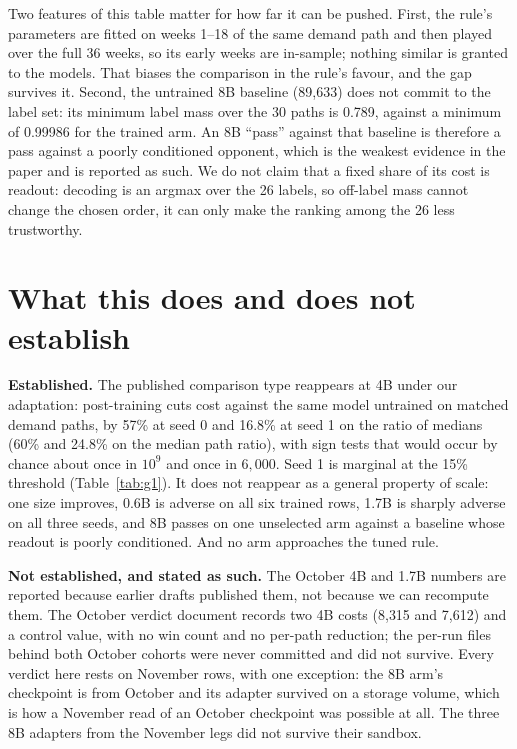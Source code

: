 \documentclass[11pt]{article}
\begin{document}
Two features of this table matter for how far it can be pushed. First, the rule's parameters are
fitted on weeks 1--18 of the same demand path and then played over the full 36 weeks, so its early
weeks are in-sample; nothing similar is granted to the models. That biases the comparison in the
rule's favour, and the gap survives it. Second, the untrained 8B baseline (89{,}633) does not commit to the label set: its minimum label mass
over the 30 paths is 0.789, against a minimum of 0.99986 for the trained arm. An 8B ``pass''
against that baseline is therefore a pass against a poorly conditioned opponent, which is the weakest
evidence in the paper and is reported as such. We do not claim that a fixed share of its cost is
readout: decoding is an argmax over the 26 labels, so off-label mass cannot change the chosen order,
it can only make the ranking among the 26 less trustworthy.

\section{What this does and does not establish}\label{sec:solid}

\textbf{Established.} The published comparison type reappears at 4B under our adaptation: post-training
cuts cost against the same model untrained on matched demand paths, by 57\% at seed 0 and 16.8\% at
seed 1 on the ratio of medians (60\% and 24.8\% on the median path ratio), with sign tests that would
occur by chance about once in $10^{9}$ and once in $6{,}000$. Seed 1 is marginal at the 15\% threshold
(Table~\ref{tab:g1}). It does not
reappear as a general property of scale: one size improves, 0.6B is adverse on all six trained rows,
1.7B is sharply adverse on all three seeds, and 8B passes on one unselected arm against a baseline
whose readout is poorly conditioned. And no arm approaches the tuned rule.

\textbf{Not established, and stated as such.} The October 4B and 1.7B numbers are reported because
earlier drafts published them, not because we can recompute them. The October verdict document records
two 4B costs (8{,}315 and 7{,}612) and a control value, with no win count and no per-path reduction; the
per-run files behind both October cohorts were never committed and did not survive. Every verdict here
rests on November rows, with one exception: the 8B arm's checkpoint is from October and its adapter
survived on a storage volume, which is how a November read of an October checkpoint was possible at
all. The three 8B adapters from the November legs did not survive their sandbox.
\end{document}
